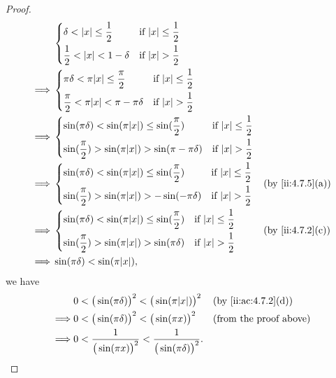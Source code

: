 \begin{proof}
\begin{align*}
             & \begin{dcases}
                 \delta < \abs{x} \leq \dfrac{1}{2}  & \text{if } \abs{x} \leq \dfrac{1}{2} \\
                 \dfrac{1}{2} < \abs{x} < 1 - \delta & \text{if } \abs{x} > \dfrac{1}{2}    \\
               \end{dcases}                               \\
    \implies & \begin{dcases}
                 \pi \delta < \pi \abs{x} \leq \dfrac{\pi}{2}    & \text{if } \abs{x} \leq \dfrac{1}{2} \\
                 \dfrac{\pi}{2} < \pi \abs{x} < \pi - \pi \delta & \text{if } \abs{x} > \dfrac{1}{2}    \\
               \end{dcases}                   \\
    \implies & \begin{dcases}
                 \sin(\pi \delta) < \sin(\pi \abs{x}) \leq \sin(\dfrac{\pi}{2})    & \text{if } \abs{x} \leq \dfrac{1}{2} \\
                 \sin(\dfrac{\pi}{2}) > \sin(\pi \abs{x}) > \sin(\pi - \pi \delta) & \text{if } \abs{x} > \dfrac{1}{2}    \\
               \end{dcases} \\
    \implies & \begin{dcases}
                 \sin(\pi \delta) < \sin(\pi \abs{x}) \leq \sin(\dfrac{\pi}{2}) & \text{if } \abs{x} \leq \dfrac{1}{2} \\
                 \sin(\dfrac{\pi}{2}) > \sin(\pi \abs{x}) > -\sin(-\pi \delta)  & \text{if } \abs{x} > \dfrac{1}{2}    \\
               \end{dcases}    &  & \by{ii:4.7.5}[a]    \\
    \implies & \begin{dcases}
                 \sin(\pi \delta) < \sin(\pi \abs{x}) \leq \sin(\dfrac{\pi}{2}) & \text{if } \abs{x} \leq \dfrac{1}{2} \\
                 \sin(\dfrac{\pi}{2}) > \sin(\pi \abs{x}) > \sin(\pi \delta)    & \text{if } \abs{x} > \dfrac{1}{2}    \\
               \end{dcases}    &  & \by{ii:4.7.2}[c]    \\
    \implies & \sin(\pi \delta) < \sin(\pi \abs{x}),
  \end{align*}
  we have
  \begin{align*}
             & 0 < \big(\sin(\pi \delta)\big)^2 < \big(\sin(\pi \abs{x})\big)^2                  &  & \by{ii:ac:4.7.2}[d]           \\
    \implies & 0 < \big(\sin(\pi \delta)\big)^2 < \big(\sin(\pi x)\big)^2                        &  & \text{(from the proof above)} \\
    \implies & 0 < \dfrac{1}{\big(\sin(\pi x)\big)^2} < \dfrac{1}{\big(\sin(\pi \delta)\big)^2}.
  \end{align*}
\end{proof}

